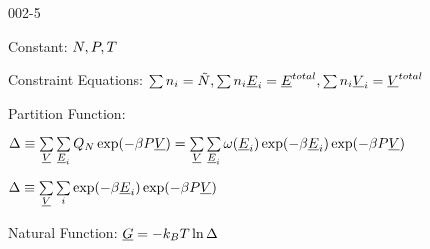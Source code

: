 \begin{mitframe}{002-5} %

    
\begin{listone}
    
    \item Constant: $\nummoles, \p, \Temp$

    \item Constraint Equations: $\sum\nolimits \molspecies{i} = \totmoles, \sum\nolimits \molspecies{i}\uline{\energy}_{i} = \uline{\energy}^{total},\sum\nolimits \molspecies{i}\uline{\vol}_{i} = \uline{\vol}^{total}  $     %
    
    \item Partition Function:
    
    \begin{listtwo}
    
    	\item $\iipf \equiv \sum\limits_{\uline{\vol}}\sum\limits_{\uline{\energy}_{i}} \cpf\exp(-\boltznorm\p\uline{\vol}) = \sum\limits_{\uline{\vol}}\sum\limits_{\uline{\energy}_{i}} \mpf(\uline{\energy}_{i})\exp(-\boltznorm\uline{\energy}_{i})\exp(-\boltznorm\p\uline{\vol}) $
    
    	\item $\iipf \equiv \sum\limits_{\uline{\vol}}\sum\limits_{i} \exp(-\boltznorm\uline{\energy}_{i})\exp(-\boltznorm\p\uline{\vol}) $
    
    \end{listtwo}
        
    \item Natural Function: $\uline{\gibbs} = -\boltz\Temp\ln\iipf$
    
    
\end{listone}
    
\end{mitframe}
